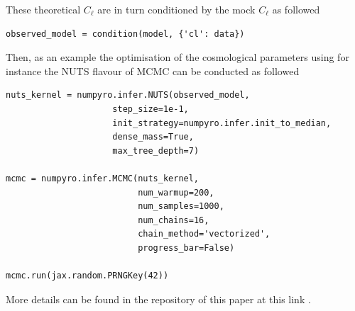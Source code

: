 \documentclass[twocolumn,twocolappendix,nofootinbib]{openjournal}
\newcommand{\nblink}[1]{\href{https://github.com/DifferentiableUniverseInitiative/jax-cosmo-paper/blob/master/notebooks/#1.ipynb}{\faFileCodeO}}
\begin{document}
These theoretical $C_{\ell}$ are in turn conditioned by the mock $C_\ell$ as followed
\begin{verbatim}
observed_model = condition(model, {'cl': data})
\end{verbatim}
Then, as an example the optimisation of the cosmological parameters using for instance the NUTS flavour of MCMC can be conducted as followed
\begin{verbatim}
nuts_kernel = numpyro.infer.NUTS(observed_model,
                     step_size=1e-1, 
                     init_strategy=numpyro.infer.init_to_median,
                     dense_mass=True,
                     max_tree_depth=7)

mcmc = numpyro.infer.MCMC(nuts_kernel, 
                          num_warmup=200, 
                          num_samples=1000,
                          num_chains=16,
                          chain_method='vectorized',
                          progress_bar=False)

mcmc.run(jax.random.PRNGKey(42))
\end{verbatim}
More details can be found in the repository of this paper at this link \nblink{VectorizedNumPyro_block}.
 
\typeout{}


\end{document}

